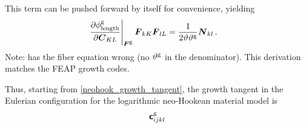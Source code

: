 \documentclass[10pt,letterpaper,oneside]{report}
\newcommand{\ten}[1]{\mbox{\boldmath $#1$}{}}
\newcommand{\tenf}[1]{\mbox{{\sffamily{\bfseries {#1}}}}}
\newcommand{\scas}[1]{\mbox{{\scriptsize{${\rm{#1}}$}}}{}}
\newcommand{\tens}[1]{\mbox{\boldmath{\scriptsize{$#1$}}}{}}
\begin{document}
This term can be pushed forward by itself for convenience, yielding
\begin{align}
\left. \frac{ \partial \phi^{\scas{g}}_{\scas{length}} }{ \partial \ten{C}_{KL} } \right|_{\tens{F}^{\scas{g}}} \ten{F}_{kK} \ten{F}_{lL} 
={}& \frac{1}{2 \vartheta \vartheta^{\scas{g}}} \ten{N}_{kl} \, .
\label{growth_criterion_deriv_length}
\end{align}
Note: \textcite{Goktepe2010} has the fiber equation wrong (no $\vartheta^{\scas{g}}$ in the denominator).  This derivation matches the FEAP growth codes.  

Thus, starting from \autoref{neohook_growth_tangent}, the growth tangent in the Eulerian configuration for the logarithmic neo-Hookean material model is
\begin{align}
\tenf{c}^{\scas{g}}_{ijkl} 

\end{align}
\end{document}
